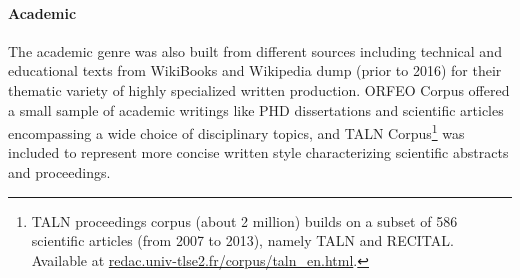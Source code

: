 \paragraph{\Cabernet Academic} \label{subsec:DescribeCaBeRnetAcad}
The academic genre was also built from different sources including technical and educational texts from WikiBooks and Wikipedia dump (prior to 2016) for their thematic variety of highly specialized written production. \textsc{ORFEO} Corpus offered a small sample of academic writings like PHD dissertations and scientific articles encompassing a wide choice of disciplinary topics, and TALN Corpus\footnote{TALN proceedings corpus (about 2 million) builds on a subset of 586 scientific articles (from 2007 to 2013), namely TALN and RECITAL. Available at \url{redac.univ-tlse2.fr/corpus/taln_en.html}.} was included to represent more concise written style characterizing scientific abstracts and proceedings.

